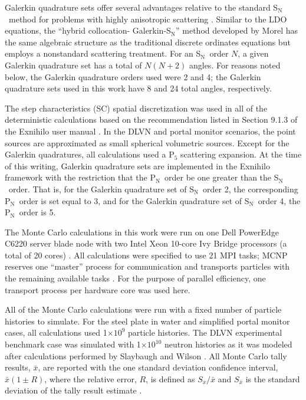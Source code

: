 \documentclass{article} %
\newcommand{\sn}{S$_\mathrm{N}$}
\newcommand{\pn}{P$_\mathrm{N}$}
\newcommand{\xbar}{\ensuremath{\bar{x}}}
\newcommand{\E}[1]{$\times10^{#1}$}
\begin{document}
Galerkin quadrature sets offer several advantages relative to the standard
\sn\ method for problems with highly anisotropic scattering \cite{morel}.
Similar to the LDO equations, the 
``hybrid collocation- Galerkin-S$_\mathrm{N}$'' method developed by Morel 
has the same algebraic structure as the traditional discrete ordinates
equations but employs a nonstandard scattering treatment. For an \sn\ order
$N$, a given Galerkin quadrature set has a total of $N(N+2)$ angles. For
reasons noted below, the Galerkin quadrature orders used were 2 and 4; the
Galerkin quadrature sets used in this work have 8 and 24 total angles,
respectively.

The step characteristics (SC) spatial discretization was used in all of the
deterministic calculations based on the recommendation listed in Section 9.1.3
of the Exnihilo user manual \cite{exum}. In the DLVN and portal monitor
scenarios, the point sources are approximated as small spherical volumetric
sources. Except for the Galerkin quadratures, all calculations used a P$_5$
scattering expansion. At the time of this writing, Galerkin quadrature sets
are implemented in the Exnihilo framework with the restriction that the \pn\
order be one greater than the \sn\ order. That is, for the Galerkin quadrature
set of \sn\ order 2, the corresponding \pn\ order is set equal to 3, and for
the Galerkin quadrature set of \sn\ order 4, the \pn\ order is 5.

The Monte Carlo calculations in this work were run on one Dell PowerEdge C6220
server blade node with two Intel Xeon 10-core Ivy Bridge processors (a total
of 20 cores) \cite{savio}. All calculations were specified to use 21 MPI
tasks; MCNP reserves one ``master'' process for communication and transports
particles with the remaining available tasks \cite{mcnp}. For the purpose of
parallel efficiency, one transport process per hardware core was used here.

All of the Monte Carlo calculations were run with a fixed number of particle
histories to simulate. For the steel plate in water and simplified portal
monitor cases, all calculations used 1\E{9} particle histories. The DLVN
experimental benchmark case was simulated with 1\E{10} neutron histories as it
was modeled after calculations performed by Slaybaugh and Wilson
\cite{sw-dlvn}. All Monte Carlo tally results, $\xbar$, are reported with the
one standard deviation confidence interval, $\xbar(1\pm R)$, where the relative
error, $R$, is defined as $S_{\xbar}/\xbar$ and $S_{\xbar}$ is the standard
deviation of the tally result estimate \cite{mcnp}.
\end{document}
